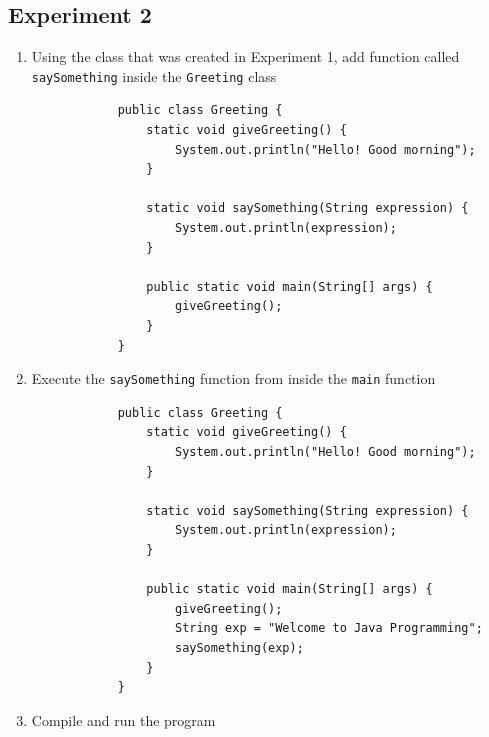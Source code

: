 \documentclass[12pt,titlepage]{article}
\begin{document}
\subsection{Experiment 2}
\begin{enumerate}
    \item {
        Using the class that was created in Experiment 1, add function called\\
        \texttt{saySomething} inside the \texttt{Greeting} class

        \begin{verbatim}
            public class Greeting {
                static void giveGreeting() {
                    System.out.println("Hello! Good morning");
                }

                static void saySomething(String expression) {
                    System.out.println(expression);
                }

                public static void main(String[] args) {
                    giveGreeting();
                }
            }
        \end{verbatim}
    }
    \item {
        Execute the \texttt{saySomething} function from inside the \texttt{main} function

        \begin{verbatim}
            public class Greeting {
                static void giveGreeting() {
                    System.out.println("Hello! Good morning");
                }

                static void saySomething(String expression) {
                    System.out.println(expression);
                }

                public static void main(String[] args) {
                    giveGreeting();
                    String exp = "Welcome to Java Programming";
                    saySomething(exp);
                }
            }
        \end{verbatim}
    }
    \item {
        Compile and run the program
    }
\end{enumerate}
\end{document}
